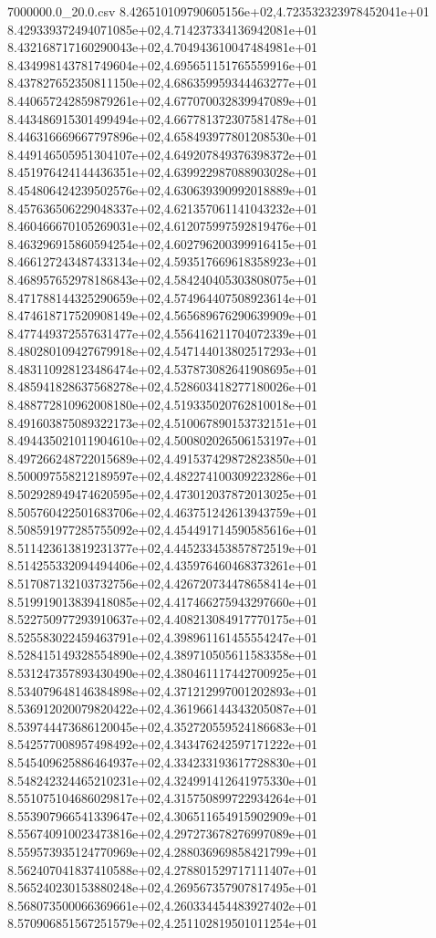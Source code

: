 \begin{filecontents*}{7000000.0_20.0.csv}
8.426510109790605156e+02,4.723532323978452041e+01
8.429339372494071085e+02,4.714237334136942081e+01
8.432168717160290043e+02,4.704943610047484981e+01
8.434998143781749604e+02,4.695651151765559916e+01
8.437827652350811150e+02,4.686359959344463277e+01
8.440657242859879261e+02,4.677070032839947089e+01
8.443486915301499494e+02,4.667781372307581478e+01
8.446316669667797896e+02,4.658493977801208530e+01
8.449146505951304107e+02,4.649207849376398372e+01
8.451976424144436351e+02,4.639922987088903028e+01
8.454806424239502576e+02,4.630639390992018889e+01
8.457636506229048337e+02,4.621357061141043232e+01
8.460466670105269031e+02,4.612075997592819476e+01
8.463296915860594254e+02,4.602796200399916415e+01
8.466127243487433134e+02,4.593517669618358923e+01
8.468957652978186843e+02,4.584240405303808075e+01
8.471788144325290659e+02,4.574964407508923614e+01
8.474618717520908149e+02,4.565689676290639909e+01
8.477449372557631477e+02,4.556416211704072339e+01
8.480280109427679918e+02,4.547144013802517293e+01
8.483110928123486474e+02,4.537873082641908695e+01
8.485941828637568278e+02,4.528603418277180026e+01
8.488772810962008180e+02,4.519335020762810018e+01
8.491603875089322173e+02,4.510067890153732151e+01
8.494435021011904610e+02,4.500802026506153197e+01
8.497266248722015689e+02,4.491537429872823850e+01
8.500097558212189597e+02,4.482274100309223286e+01
8.502928949474620595e+02,4.473012037872013025e+01
8.505760422501683706e+02,4.463751242613943759e+01
8.508591977285755092e+02,4.454491714590585616e+01
8.511423613819231377e+02,4.445233453857872519e+01
8.514255332094494406e+02,4.435976460468373261e+01
8.517087132103732756e+02,4.426720734478658414e+01
8.519919013839418085e+02,4.417466275943297660e+01
8.522750977293910637e+02,4.408213084917770175e+01
8.525583022459463791e+02,4.398961161455554247e+01
8.528415149328554890e+02,4.389710505611583358e+01
8.531247357893430490e+02,4.380461117442700925e+01
8.534079648146384898e+02,4.371212997001202893e+01
8.536912020079820422e+02,4.361966144343205087e+01
8.539744473686120045e+02,4.352720559524186683e+01
8.542577008957498492e+02,4.343476242597171222e+01
8.545409625886464937e+02,4.334233193617728830e+01
8.548242324465210231e+02,4.324991412641975330e+01
8.551075104686029817e+02,4.315750899722934264e+01
8.553907966541339647e+02,4.306511654915902909e+01
8.556740910023473816e+02,4.297273678276997089e+01
8.559573935124770969e+02,4.288036969858421799e+01
8.562407041837410588e+02,4.278801529717111407e+01
8.565240230153880248e+02,4.269567357907817495e+01
8.568073500066369661e+02,4.260334454483927402e+01
8.570906851567251579e+02,4.251102819501011254e+01

\end{filecontents*}
